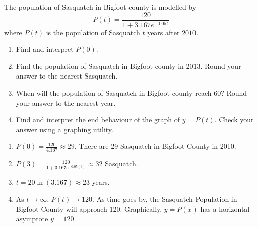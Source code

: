 {The population of Sasquatch in Bigfoot county is modelled by \[P(t) = \dfrac{120}{1 + 3.167e^{-0.05t}}\] where $P(t)$ is the population of Sasquatch $t$ years after $2010$.

\begin{enumerate}

\item  Find and interpret $P(0)$.

\item  Find the population of Sasquatch in Bigfoot county in 2013.  Round your answer to the nearest Sasquatch.

\item  When will the population of Sasquatch in Bigfoot county reach 60?  Round your answer to the nearest year.

\item  Find and interpret the end behaviour of the graph of $y = P(t)$.  Check your answer using a graphing utility. 

\end{enumerate}}
{\begin{enumerate}  \item  $P(0) = \frac{120}{4.167} \approx 29$.  There are 29 Sasquatch in Bigfoot County in 2010.

\item  $P(3) = \frac{120}{1+3.167e^{-0.05(3)}} \approx 32$ Sasquatch.

\item  $t = 20 \ln(3.167) \approx 23$ years.

\item  As $t \rightarrow \infty$, $P(t) \rightarrow 120$.  As time goes by, the Sasquatch Population in Bigfoot County will approach 120.  Graphically,  $y = P(x)$ has a horizontal asymptote $y=120$.

\end{enumerate}}